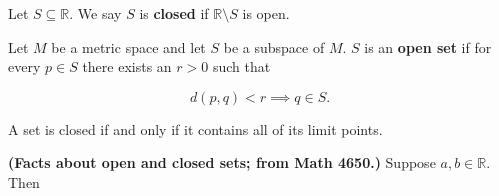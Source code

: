 \begin{definition} Let \(S \subseteq \mathbb{R}\). We say \(S\) is \textbf{closed} if \(\mathbb{R} \setminus S\) is open.

\end{definition}


\begin{definition} Let \(M\) be a metric space and let \(S\) be a subspace of \(M\). \(S\) is an \textbf{open set} if for every \(p \in S\) there exists an \(r > 0\) such that

\[
d(p, q) < r \implies q \in S.
\]

\end{definition}

\begin{theorem} A set is closed if and only if it contains all of its limit points.

\end{theorem}

\textbf{(Facts about open and closed sets; from Math 4650.)} Suppose \(a, b \in \mathbb{R}\). Then

